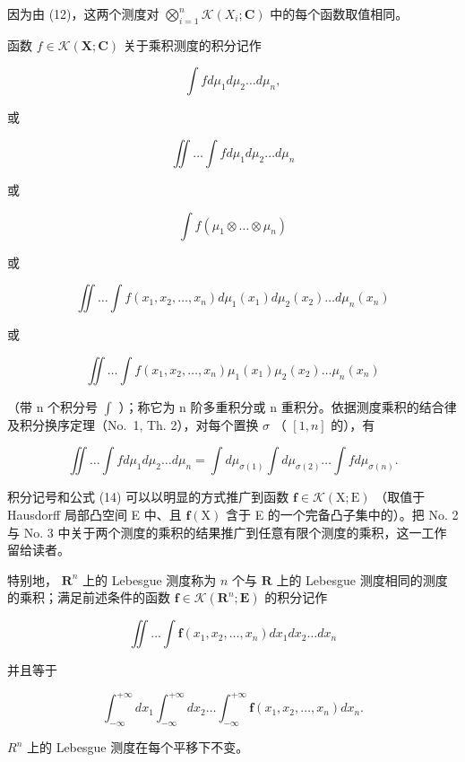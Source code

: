 因为由 (12)，这两个测度对 \(\bigotimes_ {i = 1} ^ {n} \mathcal{K}(X_{i}; \mathbf{C})\) 中的每个函数取值相同。

函数 \(f \in \mathcal{K}(\mathbf{X};\mathbf{C})\) 关于乘积测度的积分记作

\[
\int f d \mu_ {1} d \mu_ {2} \dots d \mu_ {n},
\]

或

\[
\iint \ldots \int f d \mu_ {1} d \mu_ {2} \ldots d \mu_ {n}
\]

或

\[
\int f (\mu_ {1} \otimes \dots \otimes \mu_ {n})
\]

或

\[
\iint \dots \int f (x _ {1}, x _ {2}, \dots , x _ {n}) d \mu_ {1} (x _ {1}) d \mu_ {2} (x _ {2}) \dots d \mu_ {n} (x _ {n})
\]

或

\[
\iint \dots \int f (x _ {1}, x _ {2}, \dots , x _ {n}) \mu_ {1} (x _ {1}) \mu_ {2} (x _ {2}) \dots \mu_ {n} (x _ {n})
\]

（带 n 个积分号 \(\int\) ）；称它为 n 阶多重积分或 n 重积分。依据测度乘积的结合律及积分换序定理（No.~1, Th. 2），对每个置换 \(\sigma\) （ \([1,n]\) 的），有

\[
\iint \dots \int f d \mu_ {1} d \mu_ {2} \dots d \mu_ {n} = \int d \mu_ {\sigma (1)} \int d \mu_ {\sigma (2)} \dots \int f d \mu_ {\sigma (n)}.\tag{14}
\]

积分记号和公式 (14) 可以以明显的方式推广到函数 \(\mathbf{f} \in \mathcal{K}(\mathrm{X};\mathrm{E})\) （取值于 Hausdorff 局部凸空间 E 中、且 \(\mathbf{f}(\mathrm{X})\) 含于 E 的一个完备凸子集中的）。把 No. 2 与 No. 3 中关于两个测度的乘积的结果推广到任意有限个测度的乘积，这一工作留给读者。

特别地， \(\mathbf{R}^n\) 上的 Lebesgue 测度称为 \(n\) 个与 \(\mathbf{R}\) 上的 Lebesgue 测度相同的测度的乘积；满足前述条件的函数 \(\mathbf{f} \in \mathcal{K}(\mathbf{R}^n; \mathbf{E})\) 的积分记作

\[
\iint \dots \int \mathbf {f} (x _ {1}, x _ {2}, \dots , x _ {n}) d x _ {1} d x _ {2} \dots d x _ {n}
\]

并且等于

\[
\int_ {- \infty} ^ {+ \infty} d x _ {1} \int_ {- \infty} ^ {+ \infty} d x _ {2} \dots \int_ {- \infty} ^ {+ \infty} \mathbf {f} (x _ {1}, x _ {2}, \dots , x _ {n}) d x _ {n}.
\]

\(R^{n}\) 上的 Lebesgue 测度在每个平移下不变。
\relax{}
